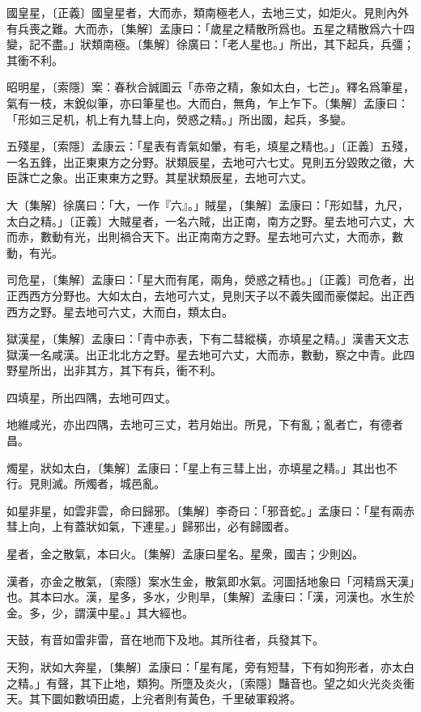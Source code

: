 國皇星，〔正義〕國皇星者，大而赤，類南極老人，去地三丈，如炬火。見則內外有兵喪之難。大而赤，〔集解〕孟康曰：「歲星之精散所爲也。五星之精散爲六十四變，記不盡。」狀類南極。〔集解〕徐廣曰：「老人星也。」所出，其下起兵，兵彊；其衝不利。

昭明星，〔索隱〕案：春秋合誠圖云「赤帝之精，象如太白，七芒」。釋名爲筆星，氣有一枝，末銳似筆，亦曰筆星也。大而白，無角，乍上乍下。〔集解〕孟康曰：「形如三足机，机上有九彗上向，熒惑之精。」所出國，起兵，多變。

五殘星，〔索隱〕孟康云：「星表有青氣如暈，有毛，填星之精也。」〔正義〕五殘，一名五鋒，出正東東方之分野。狀類辰星，去地可六七丈。見則五分毀敗之徵，大臣誅亡之象。出正東東方之野。其星狀類辰星，去地可六丈。

大〔集解〕徐廣曰：「大，一作『六』。」賊星，〔集解〕孟康曰：「形如彗，九尺，太白之精。」〔正義〕大賊星者，一名六賊，出正南，南方之野。星去地可六丈，大而赤，數動有光，出則禍合天下。出正南南方之野。星去地可六丈，大而赤，數動，有光。

司危星，〔集解〕孟康曰：「星大而有尾，兩角，熒惑之精也。」〔正義〕司危者，出正西西方分野也。大如太白，去地可六丈，見則天子以不義失國而豪傑起。出正西西方之野。星去地可六丈，大而白，類太白。

獄漢星，〔集解〕孟康曰：「青中赤表，下有二彗縱橫，亦填星之精。」漢書天文志獄漢一名咸漢。出正北北方之野。星去地可六丈，大而赤，數動，察之中青。此四野星所出，出非其方，其下有兵，衝不利。

四填星，所出四隅，去地可四丈。

地維咸光，亦出四隅，去地可三丈，若月始出。所見，下有亂；亂者亡，有德者昌。

燭星，狀如太白，〔集解〕孟康曰：「星上有三彗上出，亦填星之精。」其出也不行。見則滅。所燭者，城邑亂。

如星非星，如雲非雲，命曰歸邪。〔集解〕李奇曰：「邪音蛇。」孟康曰：「星有兩赤彗上向，上有蓋狀如氣，下連星。」歸邪出，必有歸國者。

星者，金之散氣，本曰火。〔集解〕孟康曰星名。星衆，國吉；少則凶。

漢者，亦金之散氣，〔索隱〕案水生金，散氣即水氣。河圖括地象曰「河精爲天漢」也。其本曰水。漢，星多，多水，少則旱，〔集解〕孟康曰：「漢，河漢也。水生於金。多，少，謂漢中星。」其大經也。

天鼓，有音如雷非雷，音在地而下及地。其所往者，兵發其下。

天狗，狀如大奔星，〔集解〕孟康曰：「星有尾，旁有短彗，下有如狗形者，亦太白之精。」有聲，其下止地，類狗。所墮及炎火，〔索隱〕豔音也。望之如火光炎炎衝天。其下圜如數頃田處，上兊者則有黃色，千里破軍殺將。

